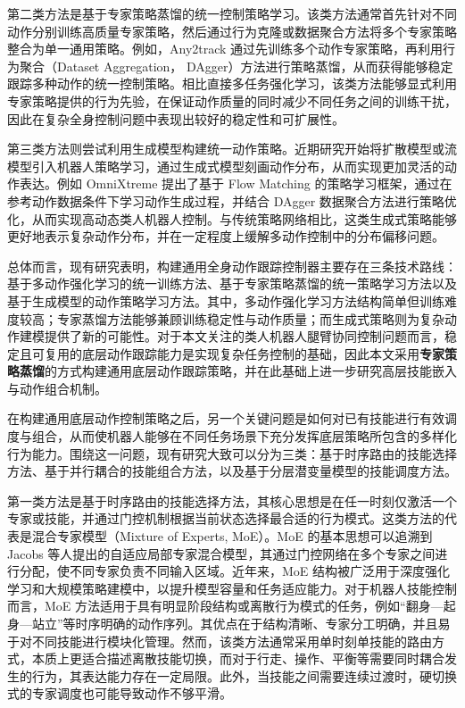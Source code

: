 第二类方法是基于专家策略蒸馏的统一控制策略学习。该类方法通常首先针对不同动作分别训练高质量专家策略，然后通过行为克隆或数据聚合方法将多个专家策略整合为单一通用策略。例如，Any2track\cite{zhang2025track} 通过先训练多个动作专家策略，再利用行为聚合（Dataset Aggregation， DAgger）方法进行策略蒸馏，从而获得能够稳定跟踪多种动作的统一控制策略。相比直接多任务强化学习，该类方法能够显式利用专家策略提供的行为先验，在保证动作质量的同时减少不同任务之间的训练干扰，因此在复杂全身控制问题中表现出较好的稳定性和可扩展性。

第三类方法则尝试利用生成模型构建统一动作策略。近期研究开始将扩散模型或流模型引入机器人策略学习，通过生成式模型刻画动作分布，从而实现更加灵活的动作表达。例如 OmniXtreme\cite{wang2026omnixtreme} 提出了基于 Flow Matching 的策略学习框架，通过在参考动作数据条件下学习动作生成过程，并结合 DAgger 数据聚合方法进行策略优化，从而实现高动态类人机器人控制。与传统策略网络相比，这类生成式策略能够更好地表示复杂动作分布，并在一定程度上缓解多动作控制中的分布偏移问题。

总体而言，现有研究表明，构建通用全身动作跟踪控制器主要存在三条技术路线：基于多动作强化学习的统一训练方法、基于专家策略蒸馏的统一策略学习方法以及基于生成模型的动作策略学习方法。其中，多动作强化学习方法结构简单但训练难度较高；专家蒸馏方法能够兼顾训练稳定性与动作质量；而生成式策略则为复杂动作建模提供了新的可能性。对于本文关注的类人机器人腿臂协同控制问题而言，稳定且可复用的底层动作跟踪能力是实现复杂任务控制的基础，因此本文采用\textbf{专家策略蒸馏}的方式构建通用底层动作跟踪策略，并在此基础上进一步研究高层技能嵌入与动作组合机制。


在构建通用底层动作控制策略之后，另一个关键问题是如何对已有技能进行有效调度与组合，从而使机器人能够在不同任务场景下充分发挥底层策略所包含的多样化行为能力。围绕这一问题，现有研究大致可以分为三类：基于时序路由的技能选择方法、基于并行耦合的技能组合方法，以及基于分层潜变量模型的技能调度方法。

第一类方法是基于时序路由的技能选择方法，其核心思想是在任一时刻仅激活一个专家或技能，并通过门控机制根据当前状态选择最合适的行为模式。这类方法的代表是混合专家模型（Mixture of Experts, MoE）。MoE 的基本思想可以追溯到 Jacobs 等人提出的自适应局部专家混合模型\cite{jacobs1991adaptive}，其通过门控网络在多个专家之间进行分配，使不同专家负责不同输入区域。近年来，MoE 结构被广泛用于深度强化学习和大规模策略建模中，以提升模型容量和任务适应能力\cite{obando2024mixtures,li2024mixtures,celik2024acquiring}。对于机器人技能控制而言，MoE 方法适用于具有明显阶段结构或离散行为模式的任务，例如“翻身—起身—站立”等时序明确的动作序列。其优点在于结构清晰、专家分工明确，并且易于对不同技能进行模块化管理。然而，该类方法通常采用单时刻单技能的路由方式，本质上更适合描述离散技能切换，而对于行走、操作、平衡等需要同时耦合发生的行为，其表达能力存在一定局限。此外，当技能之间需要连续过渡时，硬切换式的专家调度也可能导致动作不够平滑。

